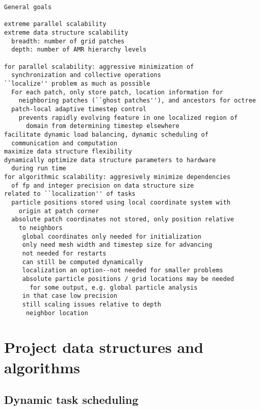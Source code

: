\documentclass[14pt,letter]{article}
\begin{document}
\begin{verbatim}
General goals

extreme parallel scalability
extreme data structure scalability
  breadth: number of grid patches
  depth: number of AMR hierarchy levels

for parallel scalability: aggressive minimization of
  synchronization and collective operations
``localize'' problem as much as possible
  For each patch, only store patch, location information for
    neighboring patches (``ghost patches''), and ancestors for octree
  patch-local adaptive timestep control
    prevents rapidly evolving feature in one localized region of
      domain from determining timestep elsewhere
facilitate dynamic load balancing, dynamic scheduling of
  communication and computation
maximize data structure flexibility
dynamically optimize data structure parameters to hardware
  during run time
for algorithmic scalability: aggresively minimize dependencies
  of fp and integer precision on data structure size
related to ``localization'' of tasks
  particle positions stored using local coordinate system with
    origin at patch corner
  absolute patch coordinates not stored, only position relative
    to neighbors
     global coordinates only needed for initialization
     only need mesh width and timestep size for advancing
     not needed for restarts
     can still be computed dynamically
     localization an option--not needed for smaller problems
     absolute particle positions / grid locations may be needed
       for some output, e.g. global particle analysis
     in that case low precision
     still scaling issues relative to depth
      neighbor location
\end{verbatim}

\section{Project data structures and algorithms}

\subsection{Dynamic task scheduling}
\end{document}
